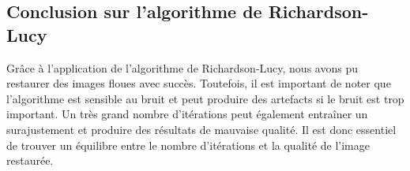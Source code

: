 \subsection{Conclusion sur l'algorithme de Richardson-Lucy}

Grâce à l'application de l'algorithme de Richardson-Lucy, nous avons pu restaurer des images floues avec succès.
Toutefois, il est important de noter que l'algorithme est sensible au bruit et peut produire des artefacts si le bruit est trop important.
Un très grand nombre d'itérations peut également entraîner un surajustement et produire des résultats de mauvaise qualité.
Il est donc essentiel de trouver un équilibre entre le nombre d'itérations et la qualité de l'image restaurée.